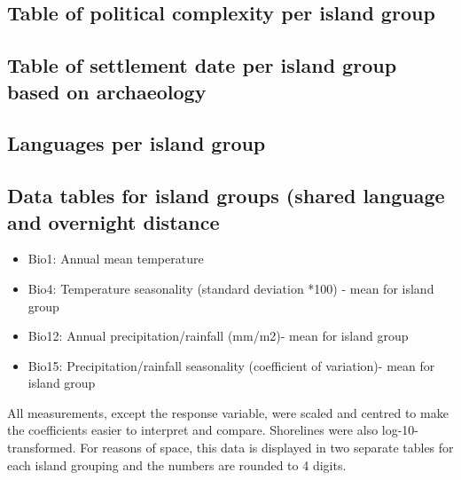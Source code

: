 \documentclass[a4paper,10pt]{article} %
\begin{document}
\FloatBarrier
\newpage
\subsection{Table of political complexity per island group }
\singlespacing
\label{appendix_pol_complex}

\newpage
\subsection{Table of settlement date per island group based on archaeology}
\singlespacing
\label{dates_table_appendic}





\subsection{Languages per island group}
\label{Subregions}
\singlespacing

\subsection{Data tables for island groups (shared language and overnight distance}
\singlespacing


\begin{itemize}
\item Bio1: Annual mean temperature
\item Bio4: Temperature seasonality (standard deviation *100) - mean for island group
\item Bio12: Annual precipitation/rainfall (mm/m2)- mean for island group
\item Bio15: Precipitation/rainfall seasonality (coefficient of variation)- mean for island group
\end{itemize}

All measurements, except the response variable, were scaled and centred to make the coefficients easier to interpret and compare. Shorelines were also log-10-transformed. For reasons of space, this data is displayed in two separate tables for each island grouping and the numbers are rounded to 4 digits.
\end{document}
